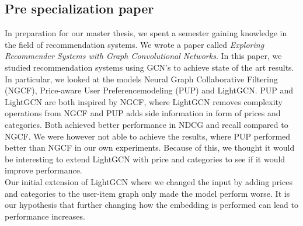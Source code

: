 \subsection{Pre specialization paper}
In preparation for our master thesis, we spent a semester gaining knowledge in the field of recommendation systems.
We wrote a paper called \textit{Exploring Recommender Systems with Graph Convolutional Networks}.
In this paper, we studied recommendation systems using GCN's to achieve state of the art results.
In particular, we looked at the models Neural Graph Collaborative Filtering (NGCF), Price-aware User Preferencemodeling (PUP) and LightGCN.
PUP and LightGCN are both inspired by NGCF, where LightGCN removes complexity operations from NGCF and PUP adds side information in form of prices and categories.
Both achieved better performance in NDCG and recall compared to NGCF.
We were however not able to achieve the results, where PUP performed better than NGCF in our own experiments.
Because of this, we thought it would be interesting to extend LightGCN with price and categories to see if it would improve performance.
\\
Our initial extension of LightGCN where we changed the input by adding prices and categories to the user-item graph only made the model perform worse.
It is our hypothesis that further changing how the embedding is performed can lead to performance increases.
